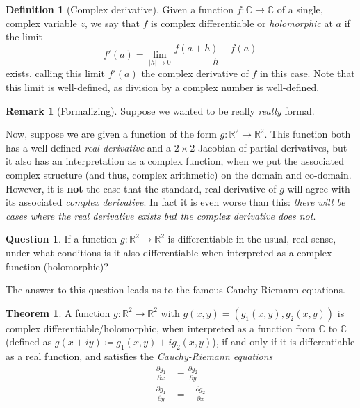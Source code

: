 \documentclass[aps,pra,showpacs,notitlepage,onecolumn,superscriptaddress,nofootinbib]{revtex4-1}
\theoremstyle{definition}
\newtheorem{definition}{Definition}[section]
\newtheorem{theorem}{Theorem}[section]
\newtheorem{remark}{Remark}[section]
\newtheorem{question}{Question}[section]
\begin{document}
\begin{definition}[Complex derivative]
  Given a function $f : \mathbb{C} \rightarrow \mathbb{C}$ of a single, complex variable $z$, we say that $f$ is complex differentiable or \emph{holomorphic} at $a$ if the limit
  \begin{equation}
    \label{eq:complex_d}
    f'(a) = \lim_{|h| \to 0} \frac{f(a + h) - f(a)}{h}
  \end{equation}
  exists, calling this limit $f'(a)$ the complex derivative of $f$ in this case. Note that this limit is well-defined, as division by a complex number is well-defined.
\end{definition}

\begin{remark}[Formalizing]
  Suppose we wanted to be really \emph{really} formal. 
  \end{remark}

\noindent Now, suppose we are given a function of the form $g : \mathbb{R}^2 \rightarrow \mathbb{R}^2$. This function both has a well-defined \emph{real derivative} and a $2 \times 2$ Jacobian of partial
derivatives, but it also has an interpretation as a complex function, when we put the associated complex structure (and thus, complex arithmetic) on the domain and co-domain. However, it is \textbf{not} the
case that the standard, real derivative of $g$ will agree with its associated \emph{complex derivative}. In fact it is even worse than this: \emph{there will be cases where the real derivative exists but the complex derivative does not}.

\begin{question}
If a function $g : \mathbb{R}^2 \rightarrow \mathbb{R}^2$ is differentiable in the usual, real sense, under what conditions is it also differentiable when interpreted as a complex function (holomorphic)?
\end{question}

\noindent The answer to this question leads us to the famous Cauchy-Riemann equations.

\begin{theorem}
  A function $g : \mathbb{R}^2 \rightarrow \mathbb{R}^2$ with $g(x, y) = (g_1(x, y), g_2(x, y))$ is complex differentiable/holomorphic, when interpreted as a function from $\mathbb{C}$ to $\mathbb{C}$ (defined as $g(x + iy) \coloneqq g_1(x, y) + i g_2(x, y)$), if and only if it is
  differentiable as a real function, and satisfies the \emph{Cauchy-Riemann equations}
  \begin{align}
    \frac{\partial g_1}{\partial x} &= \frac{\partial g_2}{\partial y} \\
    \frac{\partial g_1}{\partial y} &= -\frac{\partial g_2}{\partial x}
  \end{align}
\end{theorem}
\end{document}
